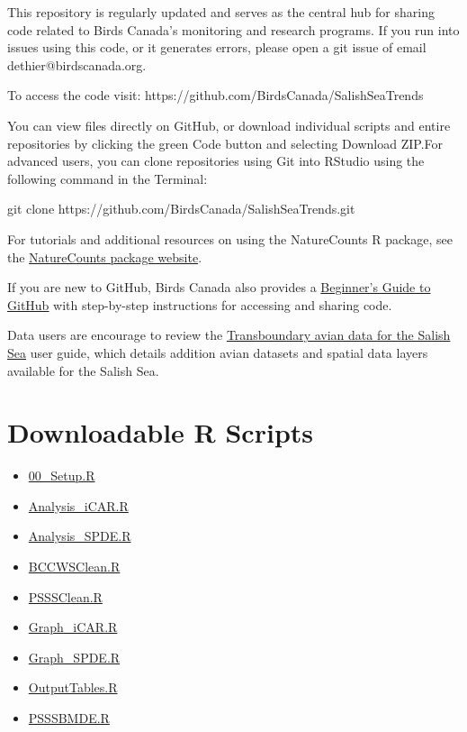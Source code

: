 \documentclass[
  letterpaper,
  DIV=11,
  numbers=noendperiod]{scrreprt}
\providecommand{\tightlist}{%
  \setlength{\itemsep}{0pt}\setlength{\parskip}{0pt}}\usepackage{longtable,booktabs,array}
\begin{document}
This repository is regularly updated and serves as the central hub for
sharing code related to Birds Canada's monitoring and research programs.
If you run into issues using this code, or it generates errors, please
open a git issue of email dethier@birdscanada.org.

To access the code visit: https://github.com/BirdsCanada/SalishSeaTrends

You can view files directly on GitHub, or download individual scripts
and entire repositories by clicking the green Code button and selecting
Download ZIP.For advanced users, you can clone repositories using Git
into RStudio using the following command in the Terminal:

git clone https://github.com/BirdsCanada/SalishSeaTrends.git

For tutorials and additional resources on using the NatureCounts R
package, see the
\href{https://birdscanada.github.io/naturecounts/articles/index.html}{NatureCounts
package website}.

If you are new to GitHub, Birds Canada also provides a
\href{https://birdscanada.github.io/BirdsCanada_GitHubGuide/}{Beginner's
Guide to GitHub} with step-by-step instructions for accessing and
sharing code.

Data users are encourage to review the
\href{https://birdscanada.github.io/TransboundaryData_SalishSea/}{Transboundary
avian data for the Salish Sea} user guide, which details addition avian
datasets and spatial data layers available for the Salish Sea.

\section{Downloadable R Scripts}\label{9.91BirdsCan}

\begin{itemize}
\tightlist
\item
  \href{Scripts/00_Setup.R}{00\_Setup.R}
\item
  \href{Scripts/Analysis_iCAR.R}{Analysis\_iCAR.R}
\item
  \href{Scripts/Analysis_SPDE.R}{Analysis\_SPDE.R}
\item
  \href{Scripts/BCCWSClean.R}{BCCWSClean.R}
\item
  \href{Scripts/PSSSClean.R}{PSSSClean.R}
\item
  \href{Scripts/Graph_iCAR.R}{Graph\_iCAR.R}
\item
  \href{Scripts/Graph_SPDE.R}{Graph\_SPDE.R}
\item
  \href{Scripts/OutputTables.R}{OutputTables.R}
\item
  \href{Scripts/PSSSBMDE.R}{PSSSBMDE.R}
\end{itemize}
\end{document}
